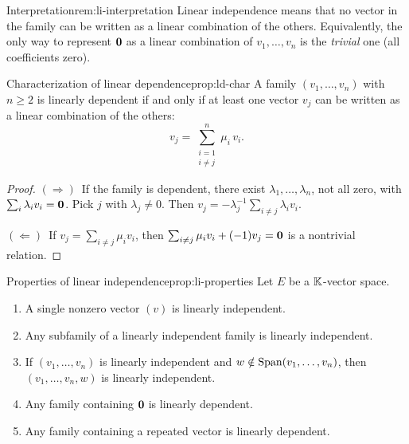 \begin{remark}{Interpretation}{rem:li-interpretation}
Linear independence means that no vector in the family can be written as
a linear combination of the others. Equivalently, the only way to
represent $\mathbf{0}$ as a linear combination of $v_1,\ldots,v_n$ is the
\emph{trivial} one (all coefficients zero).
\end{remark}

\begin{proposition}{Characterization of linear dependence}{prop:ld-char}
A family $(v_1,\ldots,v_n)$ with $n\geq 2$ is linearly dependent if and
only if at least one vector $v_j$ can be written as a linear combination
of the others:
\[
  v_j = \sum_{\substack{i=1\\i\neq j}}^n \mu_i\, v_i.
\]
\end{proposition}

\begin{proof}
$(\Rightarrow)$~If the family is dependent, there exist
$\lambda_1,\ldots,\lambda_n$, not all zero, with
$\sum_i\lambda_i v_i = \mathbf{0}$. Pick $j$ with $\lambda_j\neq 0$. Then
$v_j = -\lambda_j^{-1}\sum_{i\neq j}\lambda_i v_i$.

$(\Leftarrow)$~If $v_j = \sum_{i\neq j}\mu_i v_i$, then
$\sum_{i\neq j}\mu_i v_i + (-1)v_j = \mathbf{0}$ is a nontrivial relation.
\end{proof}

\begin{proposition}{Properties of linear independence}{prop:li-properties}
Let $E$ be a ${\mathbb{K}}$-vector space.
\begin{enumerate}[label=(\roman*)]
  \item A single nonzero vector $(v)$ is linearly independent.
  \item Any subfamily of a linearly independent family is linearly
    independent.
  \item If $(v_1,\ldots,v_n)$ is linearly independent and $w\notin
    \operatorname{Span}(v_1,\ldots,v_n)$, then $(v_1,\ldots,v_n,w)$ is linearly
    independent.
  \item Any family containing $\mathbf{0}$ is linearly dependent.
  \item Any family containing a repeated vector is linearly dependent.
\end{enumerate}
\end{proposition}

